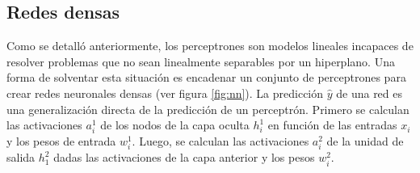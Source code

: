 \subsection{Redes densas}
Como se detalló anteriormente, los perceptrones son modelos lineales incapaces de resolver problemas que no sean
linealmente separables por un hiperplano. Una forma de solventar esta situación es encadenar un conjunto de
perceptrones para crear redes neuronales densas (ver figura \ref{fig:nn}). La predicción $\hat{y}$ de una red es una
generalización directa de la predicción de un perceptrón. Primero se calculan las activaciones $a_i^1$ de los nodos de
la capa oculta $h_i^1$ en función de las entradas $x_i$ y los pesos de entrada $w_i^1$. Luego, se calculan las
activaciones $a_i^2$ de la unidad de salida $h_1^2$ dadas las activaciones de la capa anterior y los pesos $w_i^2$.

